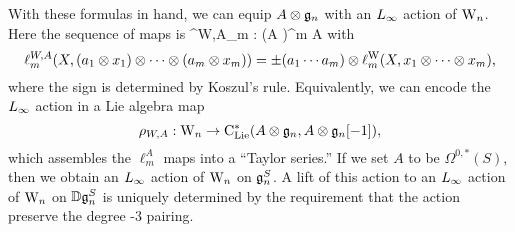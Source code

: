 With these formulas in hand, we can equip $A \otimes \mathfrak{g}_n$ with an $\L8$ action of ${{\rm W}_n}$.
Here the sequence of maps is
\ben
\ell^{W,A}_m : \Vect \otimes (A \otimes \fgn)^{\otimes m} \to A \otimes \fgn
\een
with
\[
\ell^{W,A}_m(X, (a_1 \otimes x_1)\otimes \cdots \otimes (a_m \otimes x_m)) = \pm (a_1\cdots a_m) \otimes \ell^{\rm W}_m(X,x_1 \otimes \cdots \otimes x_m),
\]
where the sign is determined by Koszul's rule.
Equivalently, we can encode the $\L8$ action in a Lie algebra map
\[
\rho_{W,A}: {{\rm W}_n} \to {\rm C}_{\rm Lie}^*(A \otimes \mathfrak{g}_n, A \otimes \mathfrak{g}_n[-1]),
\]
which assembles the $\ell^A_m$ maps into a ``Taylor series.''
If we set $A$ to be $\Omega^{0,*}(S)$, then we obtain an $\L8$ action of ${{\rm W}_n}$ on $\mathfrak{g}_n^S$.
A lift of this action to an $\L8$ action of ${{\rm W}_n}$ on $\mathbb D\mathfrak{g}_n^S$ is uniquely determined by the requirement that the action preserve the degree -3 pairing.

